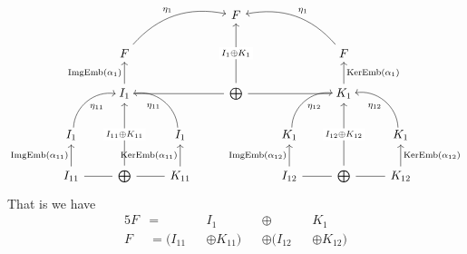 \[
\begin{tikzcd}
                                                                   &                                                                   &                                                                    & F                                                      &                                                                    &                                                                    &                                                                     \\
                                                                   & F \arrow[rru, "\eta_{1}", bend left]                              &                                                                    &                                                        &                                                                    & F \arrow[llu, "\eta_{1}"', bend right]                             &                                                                     \\
                                                                   & I_{1} \arrow[u, "\mathrm{ImgEmb}(\alpha_{1})"] \arrow[rr, dash] &                                                                    & \bigoplus \arrow[uu, "I_{1} \oplus K_{1}" description] &                                                                    & K_{1} \arrow[u, "\mathrm{KerEmb}(\alpha_{1})"'] \arrow[ll, dash] &                                                                     \\
I_{1} \arrow[ru, "\eta_{11}"', bend left=49, shift right]           &                                                                   & I_{1} \arrow[lu, "\eta_{11}", bend right=49, shift left]           &                                                        & K_{1} \arrow[ru, "\eta_{12}"', bend left=49, shift right]                        &                                                                    & K_{1} \arrow[lu, "\eta_{12}", bend right=49, shift left]                        \\
I_{11} \arrow[u, "\mathrm{ImgEmb}(\alpha_{11})"] \arrow[r, dash] & \bigoplus \arrow[uu, "I_{11}\oplus K_{11}" description]           & K_{11} \arrow[u, "\mathrm{KerEmb}(\alpha_{11})"] \arrow[l, dash] &                                                        & I_{12} \arrow[u, "\mathrm{ImgEmb}(\alpha_{12})"] \arrow[r, dash] & \bigoplus \arrow[uu, "I_{12} \oplus K_{12}" description]           & K_{12} \arrow[u, "\mathrm{KerEmb}(\alpha_{12})"'] \arrow[l, dash]
\end{tikzcd}
\]
That is we have 
\begin{alignat}{5}
F &=  &&I_{1} &&\oplus &&K_{1} \\
F &= (I_{11} &&\oplus K_{11}) &&\oplus (I_{12} &&\oplus K_{12})
\end{alignat}




